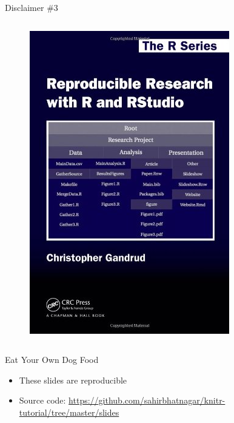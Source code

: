 \documentclass[10pt]{beamer}\usepackage[]{graphicx}\usepackage[]{color}
\begin{document}
\begin{frame}{Disclaimer \#3}
\begin{columns}[c]
\begin{figure}
\includegraphics[width=0.6\columnwidth]{chris.png}
\end{figure}
\end{columns}

\end{frame}


\begin{frame}{Eat Your Own Dog Food}

\begin{itemize}
\item These slides are reproducible
\item Source code: \href{https://github.com/sahirbhatnagar/knitr-tutorial/tree/master/slides}{https://github.com/sahirbhatnagar/knitr-tutorial/tree/master/slides}
\end{itemize}

\end{frame}
\end{document}
